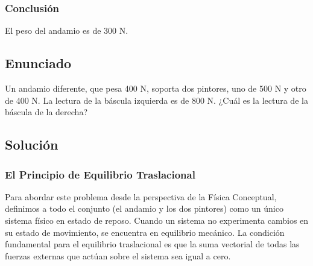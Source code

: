 \documentclass[12pt,letterpaper]{article}
\begin{document}
\subsubsection*{Conclusión}
El peso del andamio es de $300\text{ N}$.


\newpage
\subsection*{Enunciado}
Un andamio diferente, que pesa 400 N, soporta dos pintores, uno de 500 N y otro de 400 N. La lectura de la báscula izquierda es de 800 N. ¿Cuál es la lectura de la báscula de la derecha?

\begin{center}
\end{center}

\subsection*{Solución}

\subsubsection*{El Principio de Equilibrio Traslacional}
Para abordar este problema desde la perspectiva de la Física Conceptual, definimos a todo el conjunto (el andamio y los dos pintores) como un único sistema físico en estado de reposo. Cuando un sistema no experimenta cambios en su estado de movimiento, se encuentra en equilibrio mecánico. La condición fundamental para el equilibrio traslacional es que la suma vectorial de todas las fuerzas externas que actúan sobre el sistema sea igual a cero.
\end{document}
